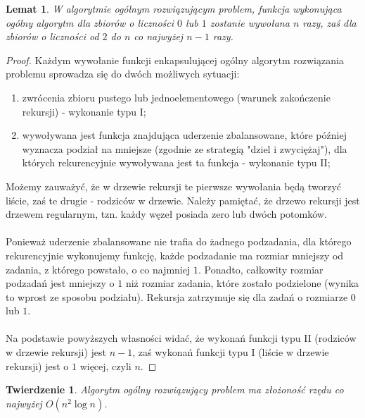 \documentclass[10pt,a4paper]{article}
\newtheorem{theorem}{Twierdzenie}
\newtheorem{lemma}{Lemat}
\begin{document}
	\begin{lemma}
		W algorytmie ogólnym rozwiązującym problem, funkcja wykonująca ogólny algorytm dla zbiorów o liczności $0$ lub $1$ zostanie wywołana $n$ razy, zaś dla zbiorów o liczności od $2$ do $n$ co najwyżej $n - 1$ razy.
	\end{lemma}
	
	\begin{proof}
		Każdym wywołanie funkcji enkapsulującej ogólny algorytm rozwiązania problemu sprowadza się do dwóch możliwych sytuacji:
		\begin{enumerate}
			\item zwrócenia zbioru pustego lub jednoelementowego (warunek zakończenie rekursji) - wykonanie typu I;
			\item wywoływana jest funkcja znajdująca uderzenie zbalansowane, które później wyznacza podział na mniejsze (zgodnie ze strategią "dziel i zwyciężaj"), dla których rekurencyjnie wywoływana jest ta funkcja - wykonanie typu II;
		\end{enumerate} 
		Możemy zauważyć, że w drzewie rekursji te pierwsze wywołania będą tworzyć liście, zaś te drugie - rodziców w drzewie. Należy pamiętać, że drzewo rekursji jest drzewem regularnym, tzn. każdy węzeł posiada zero lub dwóch potomków.\\~\\
		Ponieważ uderzenie zbalansowane nie trafia do żadnego podzadania, dla którego rekurencyjnie wykonujemy funkcję, każde podzadanie ma rozmiar mniejszy od zadania, z którego powstało, o co najmniej $1$. Ponadto, całkowity rozmiar podzadań jest mniejszy o $1$ niż rozmiar zadania, które zostało podzielone (wynika to wprost ze sposobu podziału). Rekursja zatrzymuje się dla zadań o rozmiarze $0$ lub $1$.\\~\\
		Na podstawie powyższych własności widać, że wykonań funkcji typu II (rodziców w drzewie rekursji) jest $n - 1$, zaś wykonań funkcji typu I (liście w drzewie rekursji) jest o $1$ więcej, czyli $n$.
	\end{proof}	
	
	\begin{theorem}
		Algorytm ogólny rozwiązujący problem ma złożoność rzędu co najwyżej $O(n^{2} \log n)$.
	\end{theorem}
	
\end{document}
